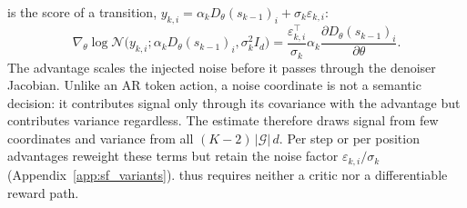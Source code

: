 is the score of a transition, $y_{k,i}=\alpha_kD_\theta(s_{k-1})_i+\sigma_k\varepsilon_{k,i}$:
\begin{equation}
\nabla_\theta\log\mathcal N\!\big(y_{k,i};\alpha_kD_\theta(s_{k-1})_i,\sigma_k^2I_d\big)=\frac{\varepsilon_{k,i}^{\top}}{\sigma_k}\alpha_k\frac{\partial D_\theta(s_{k-1})_i}{\partial\theta}.
\label{eq:sf}
\end{equation}
The advantage scales the injected noise before it passes through the denoiser Jacobian. Unlike an AR token action, a noise coordinate is not a semantic decision: it contributes signal only through its covariance with the advantage but contributes variance regardless. The estimate therefore draws signal from few coordinates and variance from all $(K{-}2)\,|\mathcal G|\,d$. Per step or per position advantages reweight these terms but retain the noise factor $\varepsilon_{k,i}/\sigma_k$ (Appendix~\ref{app:sf_variants}). \methodGRPO{} thus requires neither a critic nor a differentiable reward path.
